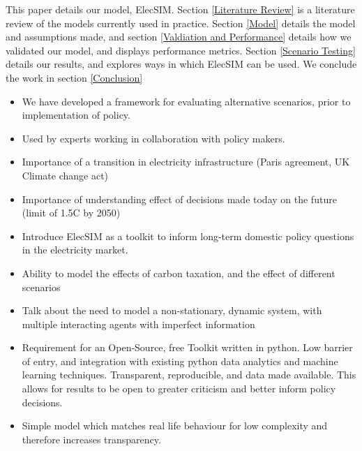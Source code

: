 This paper details our model, ElecSIM. Section \ref{Literature Review} is a literature review of the models currently used in practice. Section \ref{Model} details the model and assumptions made, and section \ref{Valdiation and Performance} details how we validated our model, and displays performance metrics. Section \ref{Scenario Testing} details our results, and explores ways in which ElecSIM can be used. We conclude the work in section \ref{Conclusion}
 

\begin{itemize}
	\item We have developed a framework for evaluating alternative scenarios, prior to implementation of policy.
	\item Used by experts working in collaboration with policy makers.
	\item Importance of a transition in electricity infrastructure (Paris agreement, UK Climate change act)
	\item Importance of understanding effect of decisions made today on the future (limit of 1.5C by 2050)
	\item Introduce ElecSIM as a toolkit to inform long-term domestic policy questions in the electricity market. 
	\item Ability to model the effects of carbon taxation, and the effect of different scenarios 
	\item Talk about the need to model a non-stationary, dynamic system, with multiple interacting agents with imperfect information
	\item Requirement for an Open-Source, free Toolkit written in python. Low barrier of entry, and integration with existing python data analytics and machine learning techniques. Transparent, reproducible, and data made available. This allows for results to be open to greater criticism and better inform policy decisions.
	\item Simple model which matches real life behaviour for low complexity and therefore increases transparency.
\end{itemize}


